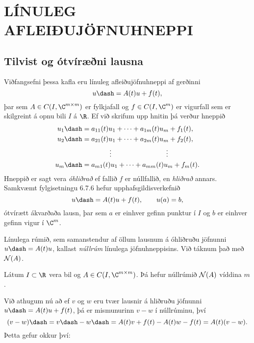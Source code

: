%
%
%

\chapter{LÍNULEG AFLEIÐUJÖFNUHNEPPI}


\section {Tilvist og ótvíræðni lausna}


\noindent
Viðfangsefni þessa kafla eru línuleg afleiðujöfnuhneppi  af gerðinni
 \begin{equation*}u\dash=A(t)u+f(t),\label{5.1.1}
 \end{equation*}
þar sem $A\in C(I,\C^{m\times m})$ er fylkjafall og $f\in C(I,\C^m)$ 
er vigurfall sem er skilgreint á opnu bili $I$ á $\R$.  Ef við skrifum upp
hnitin þá verður hneppið 
\begin{align*}
u_1\dash&=a_{11}(t)u_1+\cdots+a_{1m}(t)u_m+f_1(t),\\
u_2\dash&=a_{21}(t)u_1+\cdots+a_{2m}(t)u_m+f_2(t),\\
&\qquad \qquad \vdots\qquad \qquad \qquad \qquad \vdots\\
u_m\dash&=a_{m1}(t)u_1+\cdots+a_{mm}(t)u_m+f_m(t).
\end{align*}
Hneppið er sagt vera {\it
óhliðrað} ef
fallið $f$ er núllfallið, en {\it
hliðrað} annars.   Samkvæmt
fylgisetningu 6.7.6  hefur upphafsgildisverkefnið
\begin{equation*}
u\dash=A(t)u+f(t), \qquad u(a)=b,\label{5.1.2}
\end{equation*}
ótvírætt ákvarðaða lausn, þar sem $a$ er einhver gefinn punktur í $I$
og $b$ er einhver gefinn vigur í $\C^m$.  

\begin{sk}
Línulega rúmið, sem samanstendur af öllum lausnum á óhliðruðu
jöfnunni $u\dash=A(t)u$, kallast {\it
núllrúm
} línulega
jöfnuhneppisins.  Við táknum það með ${\cal N}(A)$.
\end{sk}


\begin{se}
Látum $I\subset \R$ vera bil og $A\in C(I,\C\sp
{m\times m})$. Þá hefur núllrúmið ${\cal N}(A)$ víddina $m$.
\end{se}

Við athugum nú að ef $v$ og $w$ eru tvær lausnir á hliðruðu jöfnunni
$u\dash=A(t)u+f(t)$, þá er mismunurinn $v-w$ í núllrúminu, því
 $$(v-w)\dash=v\dash-w\dash=A(t)v+f(t)-A(t)w-f(t)=A(t)(v-w).
 $$
Þetta gefur okkur því:

